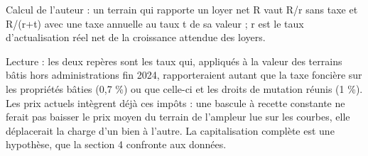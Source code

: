 Calcul de l'auteur : un terrain qui rapporte un loyer net R vaut R/r sans taxe et R/(r+t) avec une taxe annuelle au taux t de sa valeur ; r est le taux d'actualisation réel net de la croissance attendue des loyers.\par Lecture : les deux repères sont les taux qui, appliqués à la valeur des terrains bâtis hors administrations fin 2024, rapporteraient autant que la taxe foncière sur les propriétés bâties (0,7 \%) ou que celle-ci et les droits de mutation réunis (1 \%). Les prix actuels intègrent déjà ces impôts : une bascule à recette constante ne ferait pas baisser le prix moyen du terrain de l'ampleur lue sur les courbes, elle déplacerait la charge d'un bien à l'autre. La capitalisation complète est une hypothèse, que la section 4 confronte aux données.

